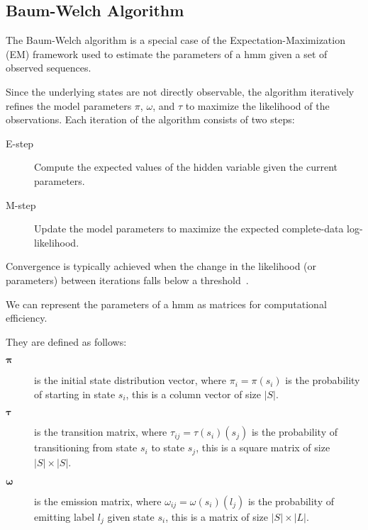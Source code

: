 
\subsection{Baum-Welch Algorithm}\label{subsec:baum-welch}
The Baum-Welch algorithm is a special case of the Expectation-Maximization (EM) framework used to estimate the parameters of a \gls{hmm} given a set of observed sequences.

Since the underlying states are not directly observable, the algorithm iteratively refines the model parameters $\pi$, $\omega$, and $\tau$ to maximize the likelihood of the observations.
Each iteration of the algorithm consists of two steps:


\begin{description}
    \item[E-step] Compute the expected values of the hidden variable given the current parameters.
    \item[M-step] Update the model parameters to maximize the expected complete-data log-likelihood.
\end{description}


Convergence is typically achieved when the change in the likelihood (or parameters) between iterations falls below a threshold~\cite{Rabiner89}.

We can represent the parameters of a \gls{hmm} as matrices for computational efficiency.

They are defined as follows:


\begin{description}
    \item[$\pmb{\pi}$] is the initial state distribution vector, where $\pi_i = \pi(s_i)$ is the probability of starting in state $s_i$, this is a column vector of size $|S|$.
    \item[$\pmb{\tau}$] is the transition matrix, where $\tau_{ij} = \tau(s_i)(s_j)$ is the probability of transitioning from state $s_i$ to state $s_j$, this is a square matrix of size $|S| \times |S|$.
    \item[$\pmb{\omega}$] is the emission matrix, where $\omega_{ij} = \omega(s_i)(l_j)$ is the probability of emitting label $l_j$ given state $s_i$, this is a matrix of size $|S| \times |L|$.
\end{description}



